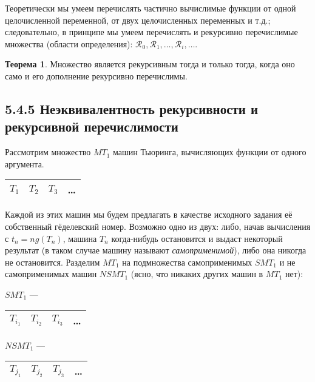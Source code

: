 \documentclass[a4paper, 12pt]{article}  %
\theoremstyle{definition}
\newtheorem*{theorem}{Теорема}
\begin{document}
		Теоретически мы умеем перечислять частично вычислимые функции от одной целочисленной переменной, от
		двух целочисленных переменных и т.д.; следовательно, в принципе мы умеем перечислять и рекурсивно
		перечислимые множества (области определения):
		$\mathscr{R}_0, \mathscr{R}_1, \dots, \mathscr{R}_i, \dots$.
		
		\begin{theorem}
			Множество является рекурсивным тогда и только тогда, когда оно само и его дополнение рекурсивно
			перечислимы.
		\end{theorem}
		
	\subsection*{5.4.5 Неэквивалентность рекурсивности и рекурсивной перечислимости}
		
		Рассмотрим множество $MT_1$ машин Тьюринга, вычисляющих функции от одного аргумента.
		\begin{center}
			\begin{tabular}{|c|c|c|c}
				\hline
				$T_1$ & $T_2$ & $T_3$ & \dots  \\
				\hline
			\end{tabular}
		\end{center}
		
		Каждой из этих машин мы будем предлагать в качестве исходного задания её собственный гёделевский
		номер. Возможно одно из двух: либо, начав вычисления с $t_n = ng(T_n)$, машина $T_n$ когда-нибудь
		остановится и выдаст некоторый результат (в таком случае машину называют \textit{самоприменимой}),
		либо она никогда не остановится. Разделим $MT_1$ на подмножества самоприменимых $SMT_1$ и не
		самоприменимых машин $NSMT_1$ (ясно, что никаких других машин в $MT_1$ нет):
		
		\begin{center}
			\begin{multicols}{2}	
				$SMT_1$ ---
				\begin{tabular}{|c|c|c|c}
					\hline
					$T_{i_1}$ & $T_{i_2}$ & $T_{i_3}$ & \dots  \\
					\hline
				\end{tabular}
			
				$NSMT_1$ ---
				\begin{tabular}{|c|c|c|c}
					\hline
					$T_{j_1}$ & $T_{j_2}$ & $T_{j_3}$ & \dots  \\
					\hline
				\end{tabular}
			\end{multicols}
		\end{center}
		
\end{document}
